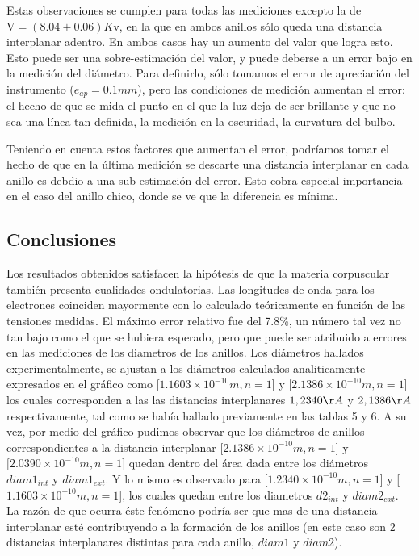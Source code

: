 \documentclass[]{article}
\begin{document}
Estas observaciones se cumplen para todas las mediciones excepto la de
\(\mathrm{V} = (8.04 \pm 0.06)K\mathrm{v}\), en la que en ambos anillos
sólo queda una distancia interplanar adentro. En ambos casos hay un
aumento del valor que logra esto. Esto puede ser una sobre-estimación
del valor, y puede deberse a un error bajo en la medición del diámetro.
Para definirlo, sólo tomamos el error de apreciación del instrumento
(\(e_{ap} = 0.1mm\)), pero las condiciones de medición aumentan el
error: el hecho de que se mida el punto en el que la luz deja de ser
brillante y que no sea una línea tan definida, la medición en la
oscuridad, la curvatura del bulbo.

Teniendo en cuenta estos factores que aumentan el error, podríamos tomar
el hecho de que en la última medición se descarte una distancia
interplanar en cada anillo es debdio a una sub-estimación del error.
Esto cobra especial importancia en el caso del anillo chico, donde se ve
que la diferencia es mínima.



\hypertarget{conclusiones}{%
\subsection{Conclusiones}\label{conclusiones}}

Los resultados obtenidos satisfacen la hipótesis de que la materia
corpuscular también presenta cualidades ondulatorias. Las longitudes de
onda para los electrones coinciden mayormente con lo calculado teóricamente en
función de las tensiones medidas. El máximo error relativo fue del
7.8\%, un número tal vez no tan bajo como el que se hubiera esperado, pero 
que puede ser atribuido a errores en las mediciones de los diametros de los
anillos. Los diámetros hallados experimentalmente, se ajustan a los 
diámetros calculados analiticamente expresados en el gráfico como 
[$1.1603 \times 10^{-10} m, n=1$] y [$2.1386 \times 10^{-10} m, n=1$] los cuales corresponden a las las distancias interplanares $1,2340 \AA$ y $2,1386 \AA$ respectivamente, tal como se había hallado previamente en las tablas 5 y 6. 
A su vez, por medio del gráfico pudimos observar que los diámetros de anillos 
correspondientes a la distancia interplanar $[2.1386 \times 10^{-10} m, n=1$] y 
$[2.0390 \times10^{-10} m, n=1$] quedan dentro del área dada entre los diámetros 
$diam1_{int}$ y $diam1_{ext}$. Y lo mismo es observado para [$1.2340 \times10^{-10} m, n=1$] y [$1.1603 \times10^{-10} m, n=1$], los cuales quedan entre los diametros 
$d2_{int}$ y $diam2_{ext}$. La razón de que ocurra éste fenómeno podría ser que mas de 
una distancia interplanar esté contribuyendo a la formación de los 
anillos (en este caso son 2 distancias interplanares distintas para cada 
anillo, $diam1$ y $diam2$).
\end{document}
